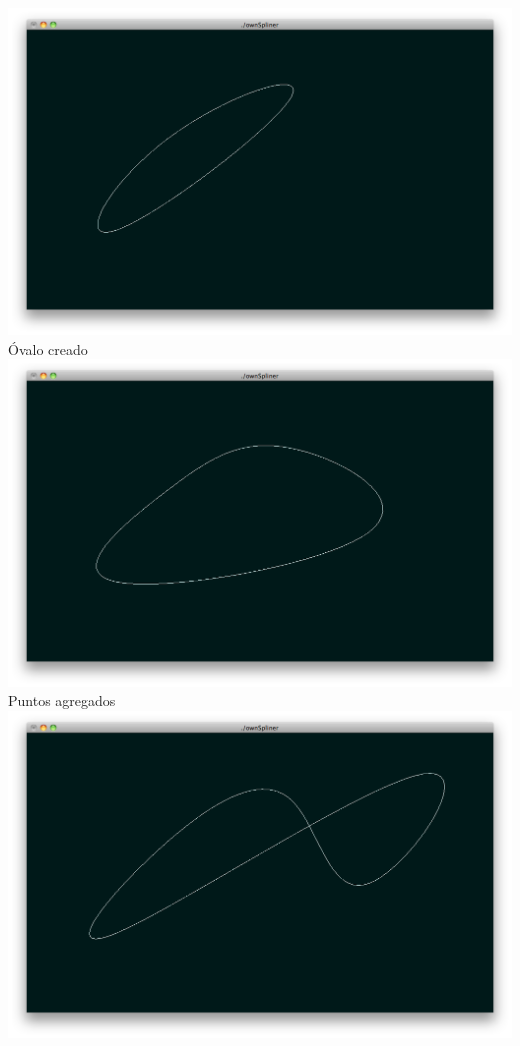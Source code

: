 \documentclass[]{article}
\begin{document}
   \centering
   \includegraphics[width=\mySize in]{3.png} \\
Óvalo creado\\
   \centering
   \includegraphics[width=\mySize in]{4.png} \\
Puntos agregados\\
   \centering
   \includegraphics[width=\mySize in]{5.png} \\
\end{document}
